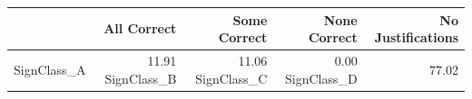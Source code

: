 \begin{tabular}{lrrrr}
\toprule
 & All Correct & Some Correct & None Correct & No Justifications \\
\midrule
SignClass_A & 11.91%
SignClass_B & 11.06%
SignClass_C & 0.00%
SignClass_D & 77.02%
\bottomrule
\end{tabular}
